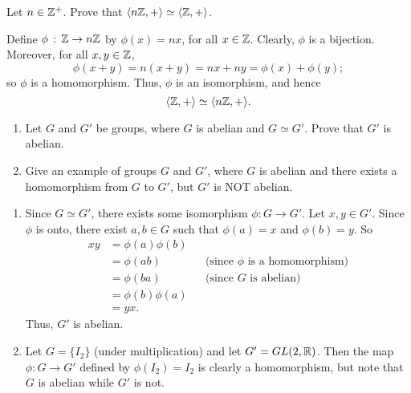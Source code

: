 \begin{exercise}[ID=3C]
Let $n\in \mathbb{Z}^+$. Prove that $\langle n\mathbb{Z},+\rangle \simeq \langle\mathbb{Z},+\rangle$.
\end{exercise}

\begin{solution}[print=false]
Define $\phi\,:\,\mathbb{Z} \rightarrow n\mathbb{Z}$
    by $\phi(x)=nx$, for all $x\in \mathbb{Z}$.  Clearly, $\phi$
    is a bijection. Moreover, for all $x,y\in \mathbb{Z}$,
$$\phi(x+y)=n(x+y)=nx+ny=\phi(x)+\phi(y);$$ so $\phi$ is a
homomorphism.  Thus, $\phi$ is an isomorphism, and hence
$$\langle\mathbb{Z}, +\rangle\simeq \langle n\mathbb{Z}, +\rangle.$$
\end{solution}

\begin{exercise}[ID=3D]

\begin{enumerate}
\item  Let $G$ and $G'$ be groups, where $G$ is abelian and  $G\simeq G'$. Prove that $G'$ is abelian.

\item Give an example of groups $G$ and $G'$, where $G$ is abelian and there exists a homomorphism from $G$ to $G'$, but $G'$ is NOT abelian.
    \end{enumerate}

\end{exercise}

\begin{solution}[print=false]
\begin{enumerate}
\item Since $G\simeq G'$, there exists some isomorphism $\phi:G\to G'$.  Let $x,y\in G'$.  Since $\phi$ is onto, there exist $a,b\in G$ such that $\phi(a)=x$ and $\phi(b)=y$.  So \begin{align*}
    xy&=\phi(a)\phi(b)&&\\
    &=\phi(ab)&&\text{(since $\phi$ is a homomorphism)}\\
    &=\phi(ba) &&\text{(since $G$ is abelian)}\\
    &=\phi(b)\phi(a)\\
    &=yx.\end{align*} Thus, $G'$ is abelian.
\item Let $G=\{I_2\}$ (under multiplication) and let $G'=GL(2,\mathbb{R})$. Then the map $\phi: G\to G'$ defined by $\phi(I_2)=I_2$ is clearly a homomorphism, but note that $G$ is abelian while $G'$ is not.
\end{enumerate}

\end{solution}

